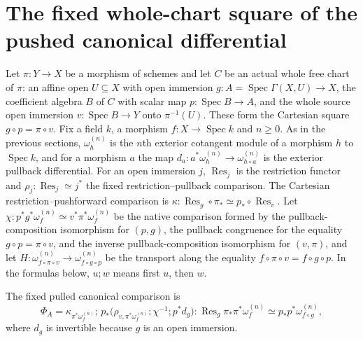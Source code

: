 \section{The fixed whole-chart square of the pushed canonical differential}

Let $\pi:Y\to X$ be a morphism of schemes and let $C$ be an actual whole
free chart of $\pi$: an affine open $U\subseteq X$ with open immersion
$g:A=\operatorname{Spec}\Gamma(X,U)\to X$, the coefficient algebra $B$ of
$C$ with scalar map $p:\operatorname{Spec}B\to A$, and the whole source
open immersion $v:\operatorname{Spec}B\to Y$ onto $\pi^{-1}(U)$. These
form the Cartesian square $g\circ p=\pi\circ v$. Fix a field $k$, a
morphism $f:X\to\operatorname{Spec}k$ and $n\geq0$. As in the previous
sections, $\omega_h^{(n)}$ is the $n$th exterior cotangent module of a
morphism $h$ to $\operatorname{Spec}k$, and for a morphism $a$ the map
$d_a:a^*\omega_h^{(n)}\to\omega_{h\circ a}^{(n)}$ is the exterior
pullback differential. For an open immersion $j$, $\operatorname{Res}_j$
is the restriction functor and $\rho_j:\operatorname{Res}_j\simeq j^*$ the
fixed restriction--pullback comparison. The Cartesian restriction--pushforward
comparison is
$\kappa:\operatorname{Res}_g\circ\pi_*\simeq p_*\circ\operatorname{Res}_v$.
Let $\chi:p^*g^*\omega_f^{(n)}\simeq v^*\pi^*\omega_f^{(n)}$ be the native
comparison formed by the pullback-composition isomorphism for $(p,g)$, the
pullback congruence for the equality $g\circ p=\pi\circ v$, and the inverse
pullback-composition isomorphism for $(v,\pi)$, and let
$H:\omega_{f\circ\pi\circ v}^{(n)}\to\omega_{f\circ g\circ p}^{(n)}$ be the
transport along the equality $f\circ\pi\circ v=f\circ g\circ p$. In the
formulas below, $u;w$ means first $u$, then $w$.

\begin{definition}
\label{def:kn-native-chart-pulled-canonical-comparison}
\leanok
The fixed pulled canonical comparison is
\[
 \Phi_A=\kappa_{\pi^*\omega_f^{(n)}};\,
 p_*\bigl(\rho_{v,\pi^*\omega_f^{(n)}};\chi^{-1};p^*d_g\bigr):
 \operatorname{Res}_g\pi_*\pi^*\omega_f^{(n)}\simeq
 p_*p^*\omega_{f\circ g}^{(n)},
\]
where $d_g$ is invertible because $g$ is an open immersion.
\end{definition}

